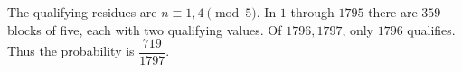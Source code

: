 The qualifying residues are $n\equiv1,4\pmod5$. In $1$ through $1795$ there are $359$ blocks of five, each with two qualifying values. Of $1796,1797$, only $1796$ qualifies. Thus the probability is $\boxed{\dfrac{719}{1797}}$.
